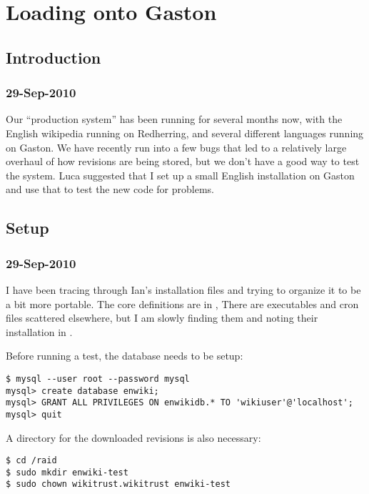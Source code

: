 \chapter{Loading onto Gaston}

\section{Introduction}

\subsection{29-Sep-2010}

Our ``production system'' has been running for several months now,
with the English wikipedia running on Redherring, and several
different languages running on Gaston.
We have recently run into a few bugs that led to a relatively large
overhaul of how revisions are being stored, but we don't have a good
way to test the system.
Luca suggested that I set up a small English installation on Gaston
and use that to test the new code for problems.

\section{Setup}

\subsection{29-Sep-2010}

I have been tracing through Ian's installation files and trying
to organize it to be a bit more portable.
The core definitions are in ,
There are executables and cron files scattered elsewhere, but I am
slowly finding them and noting their installation in
.

Before running a test, the database needs to be setup:
\begin{verbatim}
$ mysql --user root --password mysql
mysql> create database enwiki;
mysql> GRANT ALL PRIVILEGES ON enwikidb.* TO 'wikiuser'@'localhost';
mysql> quit
\end{verbatim}

A directory for the downloaded revisions is also necessary:
\begin{verbatim}
$ cd /raid
$ sudo mkdir enwiki-test
$ sudo chown wikitrust.wikitrust enwiki-test
\end{verbatim}

